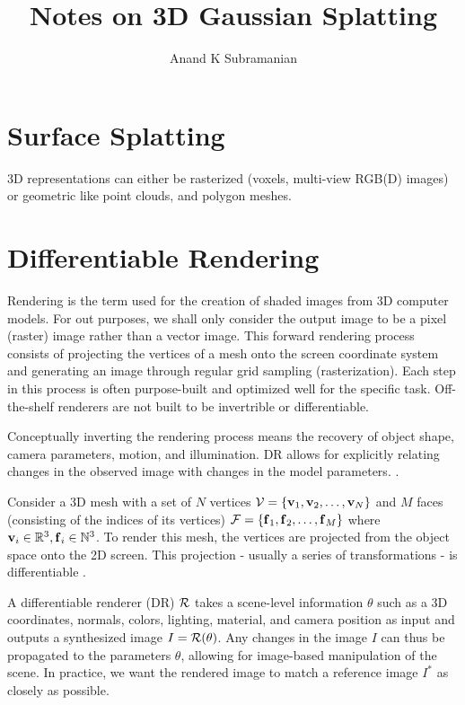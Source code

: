 \documentclass[a4paper, 11pt, twocolumn]{article}
\title{Notes on 3D Gaussian Splatting}
\author{Anand K Subramanian}
\date{}
\begin{document}
\maketitle


\section{Surface Splatting}

3D representations can either be rasterized (voxels, multi-view RGB(D) images) or geometric like point clouds, and polygon meshes.

\section{Differentiable Rendering}
Rendering is the term used for the creation of shaded images from 3D computer models. For out purposes, we shall only consider the output image to be a pixel (raster) image rather than a vector image. This forward rendering process consists of projecting the vertices of a mesh onto the screen coordinate system and generating an image through regular grid sampling (rasterization). Each step in this process is often purpose-built and optimized well for the specific task. Off-the-shelf renderers are not built to be invertrible or differentiable.

Conceptually inverting the rendering process means the recovery of object shape, camera parameters, motion, and illumination. DR allows for explicitly relating changes in the observed image with changes in the model parameters. \cite{loper2014opendr}.



Consider a 3D mesh with a set of $N$ vertices $\mbox{${\cal V}$} = \{\mbox{$\mbox{$\mathbf{v}$}$}_1, \mbox{$\mbox{$\mathbf{v}$}$}_2, \ldots, \mbox{$\mbox{$\mathbf{v}$}$}_N\}$ and $M$ faces (consisting of the indices of its vertices) $\mbox{${\cal F}$} = \{\mbox{$\mbox{$\mathbf{f}$}$}_1, \mbox{$\mbox{$\mathbf{f}$}$}_2, \ldots, \mbox{$\mbox{$\mathbf{f}$}$}_M\}$ where $\mbox{$\mbox{$\mathbf{v}$}$}_i \in \mathbb{R}^3, \mbox{$\mbox{$\mathbf{f}$}$}_i \in \mathbb{N}^3$. To render this mesh, the vertices are projected from the object space onto the 2D screen. This projection - usually a series of transformations - is differentiable \cite{shirley2009fundamentals}.


A differentiable renderer (DR) $\mbox{${\cal R}$}$ takes a scene-level information $\theta$ such as a 3D coordinates, normals, colors, lighting, material, and camera position as input and outputs a synthesized image $I = \mbox{${\cal R}$}(\theta)$. Any changes in the image $I$ can thus be propagated to the parameters $\theta$, allowing for image-based manipulation of the scene. In practice, we want the rendered image to match a reference image $I^*$ as closely as possible.
\end{document}
